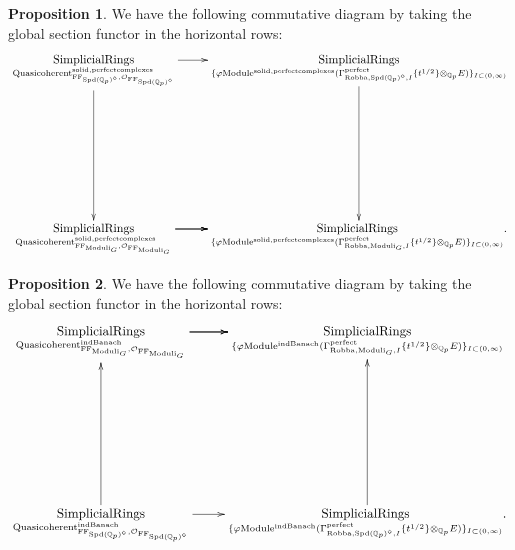 \documentclass[12pt]{book}
\theoremstyle{definition}
\newtheorem{proposition}{Proposition}
\begin{document}
\begin{proposition}
We have the following commutative diagram by taking the global section functor in the horizontal rows:
\[\displayindent=+0in
\xymatrix@C+0in@R+7pc{
\underset{\mathrm{Quasicoherent}^{\mathrm{solid,perfectcomplexes}}_{\mathrm{FF}_{\mathrm{Spd}(\mathbb{Q}_p)^\diamond},\mathcal{O}_{\mathrm{FF}_{\mathrm{Spd}(\mathbb{Q}_p)^\diamond}}}}{\mathrm{SimplicialRings}}\ar[d] \ar[r] &\underset{\{\varphi\mathrm{Module}^{\mathrm{solid,perfectcomplexes}}(\Gamma^\text{perfect}_{\text{Robba},{\mathrm{Spd}(\mathbb{Q}_p)^\diamond},I}\{t^{1/2}\}\otimes_{\mathbb{Q}_p}E)\}_{I\subset (0,\infty)}}{\mathrm{SimplicialRings}}\ar[d]\\
\underset{\mathrm{Quasicoherent}^{\mathrm{solid,perfectcomplexes}}_{\mathrm{FF}_{\mathrm{Moduli}_G},\mathcal{O}_{\mathrm{FF}_{\mathrm{Moduli}_G}}}}{\mathrm{SimplicialRings}}  \ar[r] \ar[r] \ar[r] &\underset{\{\varphi\mathrm{Module}^{\mathrm{solid,perfectcomplexes}}(\Gamma^\text{perfect}_{\text{Robba},{\mathrm{Moduli}_G},I}\{t^{1/2}\}\otimes_{\mathbb{Q}_p}E)\}_{I\subset (0,\infty)}}{\mathrm{SimplicialRings}}.  
}
\]
\end{proposition}

\begin{proposition}
We have the following commutative diagram by taking the global section functor in the horizontal rows:
\[\displayindent=+0in
\xymatrix@R+7pc{
\underset{\mathrm{Quasicoherent}^{\mathrm{indBanach}}_{\mathrm{FF}_{\mathrm{Moduli}_G},\mathcal{O}_{\mathrm{FF}_{\mathrm{Moduli}_G}}}}{\mathrm{SimplicialRings}}  \ar[r] \ar[r] \ar[r] &\underset{\{\varphi\mathrm{Module}^{\mathrm{indBanach}}(\Gamma^\text{perfect}_{\text{Robba},{\mathrm{Moduli}_G},I}\{t^{1/2}\}\otimes_{\mathbb{Q}_p}E)\}_{I\subset (0,\infty)}}{\mathrm{SimplicialRings}}   \\
\underset{\mathrm{Quasicoherent}^{\mathrm{indBanach}}_{\mathrm{FF}_{\mathrm{Spd}(\mathbb{Q}_p)^\diamond},\mathcal{O}_{\mathrm{FF}_{\mathrm{Spd}(\mathbb{Q}_p)^\diamond}}}}{\mathrm{SimplicialRings}} \ar[u]\ar[r] &\underset{\{\varphi\mathrm{Module}^\text{indBanach}(\Gamma^\text{perfect}_{\text{Robba},{\mathrm{Spd}(\mathbb{Q}_p)^\diamond},I}\{t^{1/2}\}\otimes_{\mathbb{Q}_p}E)\}_{I\subset (0,\infty)}}{\mathrm{SimplicialRings}}.\ar[u]  
}
\]
\end{proposition}
\end{document}
